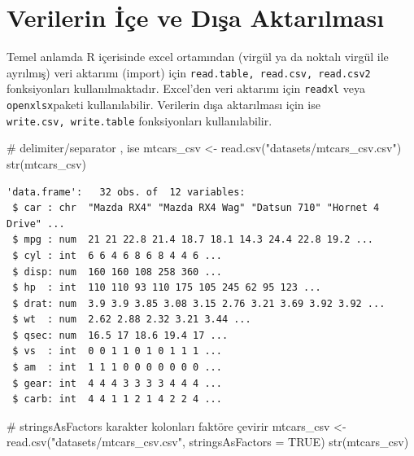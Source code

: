\documentclass[
  letterpaper,
  DIV=11,
  numbers=noendperiod]{scrreprt}
\newenvironment{Shaded}{\begin{snugshade}}{\end{snugshade}}
\newcommand{\AttributeTok}[1]{\textcolor[rgb]{0.40,0.45,0.13}{#1}}
\newcommand{\CommentTok}[1]{\textcolor[rgb]{0.37,0.37,0.37}{#1}}
\newcommand{\ConstantTok}[1]{\textcolor[rgb]{0.56,0.35,0.01}{#1}}
\newcommand{\FunctionTok}[1]{\textcolor[rgb]{0.28,0.35,0.67}{#1}}
\newcommand{\NormalTok}[1]{\textcolor[rgb]{0.00,0.23,0.31}{#1}}
\newcommand{\OtherTok}[1]{\textcolor[rgb]{0.00,0.23,0.31}{#1}}
\newcommand{\StringTok}[1]{\textcolor[rgb]{0.13,0.47,0.30}{#1}}
\begin{document}
\hypertarget{verilerin-iuxe7e-ve-dux131ux15fa-aktarux131lmasux131}{%
\chapter{Verilerin İçe ve Dışa
Aktarılması}\label{verilerin-iuxe7e-ve-dux131ux15fa-aktarux131lmasux131}}

Temel anlamda R içerisinde excel ortamından (virgül ya da noktalı virgül
ile ayrılmış) veri aktarımı (import) için
\texttt{read.table,\ read.csv,\ read.csv2} fonksiyonları
kullanılmaktadır. Excel'den veri aktarımı için \texttt{readxl} veya
\texttt{openxlsx}paketi kullanılabilir. Verilerin dışa aktarılması için
ise \texttt{write.csv,\ write.table} fonksiyonları kullanılabilir.

\begin{Shaded}
\begin{Highlighting}[]
\CommentTok{\# delimiter/separator , ise}
\NormalTok{mtcars\_csv }\OtherTok{\textless{}{-}} \FunctionTok{read.csv}\NormalTok{(}\StringTok{"datasets/mtcars\_csv.csv"}\NormalTok{)}
\FunctionTok{str}\NormalTok{(mtcars\_csv)}
\end{Highlighting}
\end{Shaded}

\begin{verbatim}
'data.frame':   32 obs. of  12 variables:
 $ car : chr  "Mazda RX4" "Mazda RX4 Wag" "Datsun 710" "Hornet 4 Drive" ...
 $ mpg : num  21 21 22.8 21.4 18.7 18.1 14.3 24.4 22.8 19.2 ...
 $ cyl : int  6 6 4 6 8 6 8 4 4 6 ...
 $ disp: num  160 160 108 258 360 ...
 $ hp  : int  110 110 93 110 175 105 245 62 95 123 ...
 $ drat: num  3.9 3.9 3.85 3.08 3.15 2.76 3.21 3.69 3.92 3.92 ...
 $ wt  : num  2.62 2.88 2.32 3.21 3.44 ...
 $ qsec: num  16.5 17 18.6 19.4 17 ...
 $ vs  : int  0 0 1 1 0 1 0 1 1 1 ...
 $ am  : int  1 1 1 0 0 0 0 0 0 0 ...
 $ gear: int  4 4 4 3 3 3 3 4 4 4 ...
 $ carb: int  4 4 1 1 2 1 4 2 2 4 ...
\end{verbatim}

\begin{Shaded}
\begin{Highlighting}[]
\CommentTok{\# stringsAsFactors karakter kolonları faktöre çevirir}
\NormalTok{mtcars\_csv }\OtherTok{\textless{}{-}} \FunctionTok{read.csv}\NormalTok{(}\StringTok{"datasets/mtcars\_csv.csv"}\NormalTok{,}
                       \AttributeTok{stringsAsFactors =} \ConstantTok{TRUE}\NormalTok{)}
\FunctionTok{str}\NormalTok{(mtcars\_csv)}
\end{Highlighting}
\end{Shaded}
\end{document}
